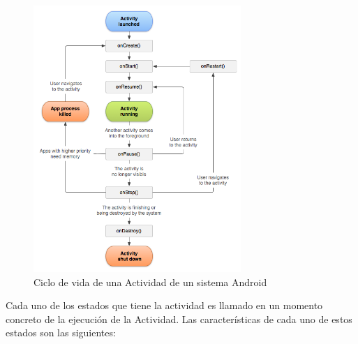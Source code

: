\begin{figure}[h]

\centering
\includegraphics[width=0.7\textwidth]{./Imagenes/Bitmap/Ciclo_de_vida_Android}
\caption{Ciclo de vida de una Actividad de un sistema Android}
\end{figure}


Cada uno de los estados que tiene la actividad es llamado en un momento concreto de la ejecuci\'on de la Actividad. Las caracter\'isticas de cada uno de estos estados son las siguientes:

